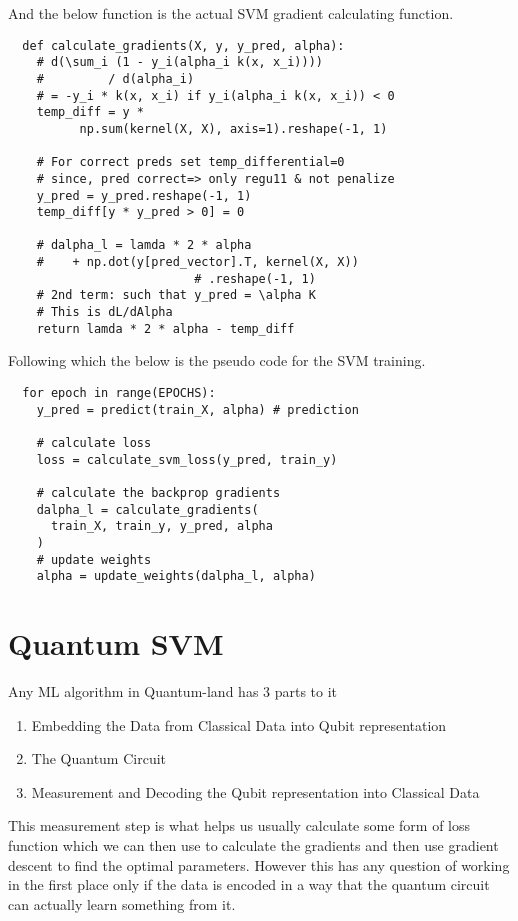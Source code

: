 \documentclass[hidelinks]{book}
\numberwithin{equation}{section}
\begin{document}
  And the below function is the actual SVM gradient calculating function.
  \begin{verbatim}
  def calculate_gradients(X, y, y_pred, alpha):
    # d(\sum_i (1 - y_i(alpha_i k(x, x_i))))
    #         / d(alpha_i)
    # = -y_i * k(x, x_i) if y_i(alpha_i k(x, x_i)) < 0
    temp_diff = y *
          np.sum(kernel(X, X), axis=1).reshape(-1, 1)

    # For correct preds set temp_differential=0
    # since, pred correct=> only regu11 & not penalize
    y_pred = y_pred.reshape(-1, 1)
    temp_diff[y * y_pred > 0] = 0

    # dalpha_l = lamda * 2 * alpha
    #    + np.dot(y[pred_vector].T, kernel(X, X))
                          # .reshape(-1, 1)
    # 2nd term: such that y_pred = \alpha K
    # This is dL/dAlpha
    return lamda * 2 * alpha - temp_diff
  \end{verbatim}

  Following which the below is the pseudo code for the SVM training.
  \begin{verbatim}
  for epoch in range(EPOCHS):
    y_pred = predict(train_X, alpha) # prediction

    # calculate loss
    loss = calculate_svm_loss(y_pred, train_y)

    # calculate the backprop gradients
    dalpha_l = calculate_gradients(
      train_X, train_y, y_pred, alpha
    )
    # update weights
    alpha = update_weights(dalpha_l, alpha)
  \end{verbatim}

\section{Quantum SVM}
Any ML algorithm in Quantum-land has 3 parts to it
\begin{enumerate}
  \item Embedding the Data from Classical Data into Qubit representation
  \item The Quantum Circuit
  \item Measurement and Decoding the Qubit representation into Classical Data
\end{enumerate}

This measurement step is what helps us usually calculate some form of loss function
which we can then use to calculate the gradients and then use gradient descent to
find the optimal parameters. However this has any question of working in the first
place only if the data is encoded in a way that the quantum circuit can actually
learn something from it.
\end{document}
